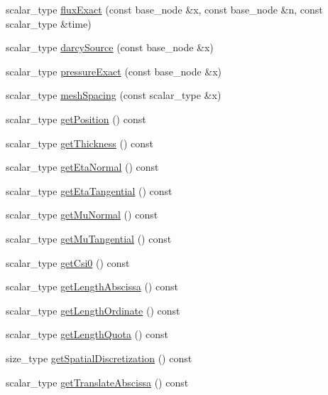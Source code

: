 \begin{DoxyCompactItemize}
\item 
scalar\-\_\-type \hyperlink{classFractureData_a92b86995549b500674b955113fc6725d}{flux\-Exact} (const base\-\_\-node \&x, const base\-\_\-node \&n, const scalar\-\_\-type \&time)
\item 
scalar\-\_\-type \hyperlink{classFractureData_a8f935d962ae1bd93ca3e3b0955517db5}{darcy\-Source} (const base\-\_\-node \&x)
\item 
scalar\-\_\-type \hyperlink{classFractureData_aa90769a75aff6485824ecd2090c8b4ee}{pressure\-Exact} (const base\-\_\-node \&x)
\item 
scalar\-\_\-type \hyperlink{classFractureData_ab79d66dd830b6e1c55ade0d940c5c8cf}{mesh\-Spacing} (const scalar\-\_\-type \&x)
\item 
scalar\-\_\-type \hyperlink{classFractureData_af86187ca0c7cc0ea6f4c3cd6e1a4cf41}{get\-Position} () const 
\item 
scalar\-\_\-type \hyperlink{classFractureData_a3ecc0d132f9cc105af6b24d676a7b9c5}{get\-Thickness} () const 
\item 
scalar\-\_\-type \hyperlink{classFractureData_a9acc76c77282d4b5d0cdca18c2b1b9ea}{get\-Eta\-Normal} () const 
\item 
scalar\-\_\-type \hyperlink{classFractureData_a7378053b4009825b4a2957484cb2a5e8}{get\-Eta\-Tangential} () const 
\item 
scalar\-\_\-type \hyperlink{classFractureData_ab059ac23b93115e05029e1b6cadd1cd9}{get\-Mu\-Normal} () const 
\item 
scalar\-\_\-type \hyperlink{classFractureData_a1ac3cca1ae035eedb2ec89c0517f8b1f}{get\-Mu\-Tangential} () const 
\item 
scalar\-\_\-type \hyperlink{classFractureData_a7b75512224a34953960a9bd09f1af661}{get\-Csi0} () const 
\item 
scalar\-\_\-type \hyperlink{classFractureData_abaebcf16d83713858e25837939ad3161}{get\-Length\-Abscissa} () const 
\item 
scalar\-\_\-type \hyperlink{classFractureData_a905e953f685b1329ddcc7ee56f8302b1}{get\-Length\-Ordinate} () const 
\item 
scalar\-\_\-type \hyperlink{classFractureData_a79747fff53da9d858950d83ad0114288}{get\-Length\-Quota} () const 
\item 
size\-\_\-type \hyperlink{classFractureData_a5c10d579be7849be1a126c24982f8a23}{get\-Spatial\-Discretization} () const 
\item 
scalar\-\_\-type \hyperlink{classFractureData_a485e084e083d9181750f19db6842a5e0}{get\-Translate\-Abscissa} () const 

\end{DoxyCompactItemize}
